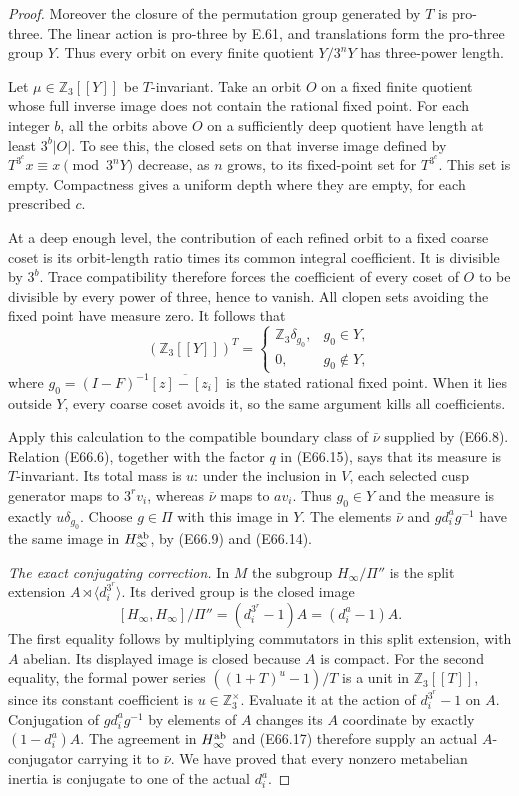 \begin{proof}
Moreover the closure of the permutation group generated by
$T$ is pro-three. The linear action is pro-three by E.61,
and translations form the pro-three group $Y$.
Thus every orbit on every finite quotient $Y/3^nY$ has
three-power length.

Let $\mu\in\mathbb Z_3[[Y]]$ be $T$-invariant.
Take an orbit $O$ on a fixed finite quotient whose full
inverse image does not contain the rational fixed point.
For each integer $b$, all the orbits above $O$ on a
sufficiently deep quotient have length at least
$3^b|O|$. To see this, the closed sets on that inverse
image defined by $T^{3^c}x\equiv x\pmod{3^nY}$ decrease,
as $n$ grows, to its fixed-point set for $T^{3^c}$.
This set is empty. Compactness gives a uniform depth
where they are empty, for each prescribed $c$.

At a deep enough level, the contribution of each refined
orbit to a fixed coarse coset is its orbit-length ratio
times its common integral coefficient. It is divisible
by $3^b$. Trace compatibility therefore forces the
coefficient of every coset of $O$ to be divisible by every
power of three, hence to vanish. All clopen sets avoiding
the fixed point have measure zero.
It follows that
\[
 (\mathbb Z_3[[Y]])^T=
 \begin{cases}
  \mathbb Z_3\delta_{g_0},&g_0\in Y,\\
  0,&g_0\notin Y,
 \end{cases}
 \tag{E66.16}
\]
where $g_0=(I-F)^{-1}\overline{[z]-[z_i]}$ is the stated
rational fixed point. When it lies outside $Y$, every
coarse coset avoids it, so the same argument kills all
coefficients.

Apply this calculation to the compatible boundary class
of $\bar\nu$ supplied by (E66.8). Relation (E66.6), together
with the factor $q$ in (E66.15), says that its measure is
$T$-invariant. Its total mass is $u$: under the inclusion
in $V$, each selected cusp generator maps to $3^rv_i$,
whereas $\bar\nu$ maps to $a v_i$. Thus $g_0\in Y$ and
the measure is exactly $u\delta_{g_0}$.
Choose $g\in\Pi$ with this image in $Y$. The elements
$\bar\nu$ and $g d_i^a g^{-1}$ have the same image in
$H_\infty^{\rm ab}$, by (E66.9) and (E66.14).

\emph{The exact conjugating correction.}
In $M$ the subgroup $H_\infty/\Pi''$ is the split extension
$A\rtimes\langle d_i^{3^r}\rangle$. Its derived group is
the closed image
\[
 [H_\infty,H_\infty]/\Pi''
           =(d_i^{3^r}-1)A=(d_i^a-1)A .
 \tag{E66.17}
\]
The first equality follows by multiplying commutators in
this split extension, with $A$ abelian. Its displayed image
is closed because $A$ is compact. For the second equality,
the formal power series $((1+T)^u-1)/T$ is a unit in
$\mathbb Z_3[[T]]$, since its constant coefficient is
$u\in\mathbb Z_3^\times$. Evaluate it at the action of
$d_i^{3^r}-1$ on $A$.
Conjugation of $g d_i^a g^{-1}$ by elements of $A$ changes
its $A$ coordinate by exactly $(1-d_i^a)A$.
The agreement in $H_\infty^{\rm ab}$ and (E66.17)
therefore supply an actual $A$-conjugator carrying it to
$\bar\nu$. We have proved that every nonzero metabelian
inertia is conjugate to one of the actual $d_i^a$.


\end{proof}

